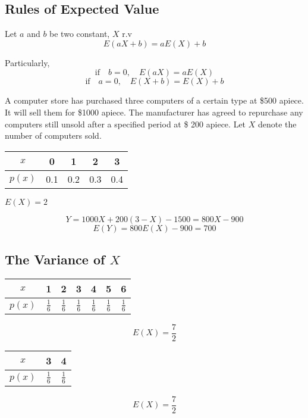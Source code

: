 \subsection{Rules of Expected Value}
\begin{prop}
Let $a$ and $b$ be two constant, $X$ r.v
\[E(aX+b)=aE(X)+b\]

Particularly,
\[\text{if} \quad b=0, \quad E(aX)=aE(X)\]
\[\text{if} \quad a=0, \quad E(X+b)=E(X)+b\]
\end{prop}

\begin{exmp}
  A computer store has purchased three computers of a certain type at \$500 apiece. It will sell them for \$1000 apiece. The manufacturer has agreed to repurchase any computers still unsold after a specified period at \$ 200 apiece. Let $X$ denote the number of computers sold.

\begin{center}
\begin{tabular}{c|cccc}
\hline
$x$ & 0 & 1 & 2 & 3 \\
\hline
$p(x)$  & 0.1 & 0.2  & 0.3  & 0.4 \\
\hline
\end{tabular}
\qquad $E(X)=2$
\end{center}

\[	Y=1000X+200(3-X)-1500=800X-900\]
\[	E(Y)=800E(X)-900=700\]
\end{exmp}

\subsection{The Variance of $X$}
\begin{exmp}
\qquad
\begin{tabular}{c|cccccc}
\hline
$x$ & 1 & 2 & 3 & 4 & 5 & 6 \\
\hline
$p(x)$  & $\frac{1}{6}$ & $\frac{1}{6}$  & $\frac{1}{6}$  & $\frac{1}{6}$ & $\frac{1}{6}$ & $\frac{1}{6}$\\
\hline
\end{tabular}

\[E(X)=\frac{7}{2}\]
  
\begin{center}
\begin{tabular}{c|cc}
\hline
$x$ &  3 & 4  \\
\hline
$p(x)$  & $\frac{1}{6}$ & $\frac{1}{6}$  \\
\hline
\end{tabular}
\end{center}

\[E(X)=\frac{7}{2}\]  
\end{exmp}

